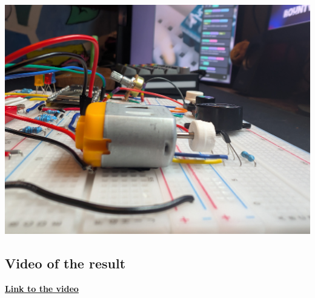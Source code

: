 \includegraphics[scale=0.05]{img/motor.jpg}

\subsection{Video of the result}
\href{https://youtu.be/1J9Z6J9Z9Z0}{\textbf{Link to the video}}